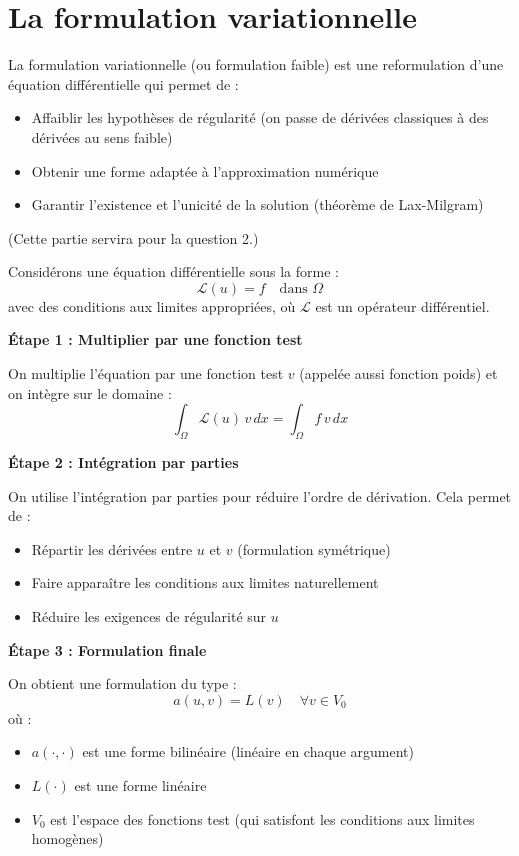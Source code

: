\documentclass[11pt,a4paper]{report}
\begin{document}
\section*{La formulation variationnelle}

\begin{rappelsBox}
La formulation variationnelle (ou formulation faible) est une reformulation d'une équation différentielle qui permet de :
\begin{itemize}
    \item Affaiblir les hypothèses de régularité (on passe de dérivées classiques à des dérivées au sens faible)
    \item Obtenir une forme adaptée à l'approximation numérique
    \item Garantir l'existence et l'unicité de la solution (théorème de Lax-Milgram)
\end{itemize}
\end{rappelsBox}

(Cette partie servira pour la question 2.)

Considérons une équation différentielle sous la forme :
\[
\mathcal{L}(u) = f \quad \text{dans } \Omega
\]
avec des conditions aux limites appropriées, où $\mathcal{L}$ est un opérateur différentiel.

\textbf{Étape 1 : Multiplier par une fonction test}

On multiplie l'équation par une fonction test $v$ (appelée aussi fonction poids) et on intègre sur le domaine :
\[
\int_\Omega \mathcal{L}(u) \, v \, dx = \int_\Omega f \, v \, dx
\]

\textbf{Étape 2 : Intégration par parties}

On utilise l'intégration par parties pour réduire l'ordre de dérivation. Cela permet de :
\begin{itemize}
    \item Répartir les dérivées entre $u$ et $v$ (formulation symétrique)
    \item Faire apparaître les conditions aux limites naturellement
    \item Réduire les exigences de régularité sur $u$
\end{itemize}

\textbf{Étape 3 : Formulation finale}

On obtient une formulation du type :
\[
a(u, v) = L(v) \quad \forall v \in V_0
\]
où :
\begin{itemize}
    \item $a(\cdot, \cdot)$ est une forme bilinéaire (linéaire en chaque argument)
    \item $L(\cdot)$ est une forme linéaire
    \item $V_0$ est l'espace des fonctions test (qui satisfont les conditions aux limites homogènes)
\end{itemize}
\end{document}
